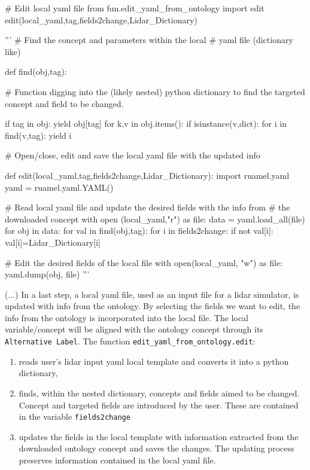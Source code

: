 \documentclass[remotesensing,article,submit,pdftex,moreauthors]{Definitions/mdpi}
\begin{document}
\begin{python}

# Edit local yaml file
from fun.edit_yaml_from_ontology import edit
edit(local_yaml,tag,fields2change,Lidar_Dictionary) 

'''
# Find the concept and parameters within the local
# yaml file (dictionary like) 

def find(obj,tag):
    
    # Function digging into the (likely nested) python dictionary to find the targeted concept and field to be changed.
    
    if tag in obj:
        yield obj[tag]
    for k,v in obj.items():       
        if isinstance(v,dict):
            for i in find(v,tag):
                yield i                

# Open/close, edit and save the local yaml file with the updated info     

def edit(local_yaml,tag,fields2change,Lidar_Dictionary):
    import ruamel.yaml
    yaml = ruamel.yaml.YAML()
    
    # Read local yaml file and update the desired fields with the info from 
    # the downloaded concept  
    with open (local_yaml,"r") as file:
        data = yaml.load_all(file)
        for obj in data:
            for val in find(obj,tag):
                for i in fields2change:
                    if not val[i]:
                        val[i]=Lidar_Dictionary[i]
    
    # Edit the desired fields of the local file
    with open(local_yaml, "w") as file:
        yaml.dump(obj, file)
'''    
\end{python}
(...) In a last step, a local yaml file, used as an input file for a lidar simulator, is updated with info from the ontology. By selecting the fields we want to edit, the info from the ontology is incorporated into the local file. The local variable/concept will be aligned with the ontology concept through its \texttt{Alternative Label}. The function  \texttt{edit\_yaml\_from\_ontology.edit}:
\begin{enumerate}
    \item reads user's lidar input yaml local template and converts it into a python dictionary,
    \item finds, within the nested dictionary, concepts and fields aimed to be changed. Concept and targeted fields are introduced by the user. These are contained in the variable \texttt{fields2change}
    \item updates the fields in the local template with information extracted from the downloaded ontology concept and saves the changes. The updating process preserves information contained in the local yaml file. 
    
\end{enumerate} 
\end{document}
